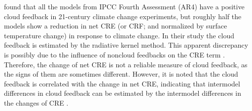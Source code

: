 
\cite{Soden2006} found that all the models from IPCC Fourth Assessment (AR4) have a positive cloud feedback in 21-century climate change experiments, but roughly half the models show a reduction in net CRE (or CRF; and normalized by surface temperature change) in response to climate change. In their study the cloud feedback is estimated by the radiative kernel method. This apparent discrepancy is possibly due to the influence of noncloud feedbacks on the CRE term \citep{Zhang1994,Soden2004}. Therefore, the change of net CRE is not a reliable measure of cloud feedback, as the signs of them are sometimes different. However, it is noted that the cloud feedback is correlated with the change in net CRE, indicating that intermodel differences in cloud feedback can be estimated by the intermodel differences in the changes of CRE \citep{Soden2006,Bony2006,Vial2013}. %

